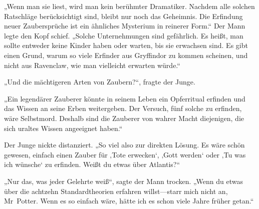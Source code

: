 „Wenn man sie liest, wird man kein berühmter Dramatiker. Nachdem alle solchen Ratschläge berücksichtigt sind, bleibt nur noch das Geheimnis. Die Erfindung neuer Zaubersprüche ist ein ähnliches Mysterium in reinerer Form.“
Der Mann legte den Kopf schief.
„Solche Unternehmungen sind gefährlich. Es heißt, man sollte entweder keine Kinder haben oder warten, bis sie erwachsen sind. Es gibt einen Grund, warum so viele Erfinder aus Gryffindor zu kommen scheinen, und nicht aus Ravenclaw, wie man vielleicht erwarten würde.“

„Und die mächtigeren Arten von Zaubern?“, fragte der Junge.

„Ein legendärer Zauberer könnte in seinem Leben ein Opferritual erfinden und das Wissen an seine Erben weitergeben. Der Versuch, fünf solche zu erfinden, wäre Selbstmord. Deshalb sind die Zauberer von wahrer Macht diejenigen, die sich uraltes Wissen angeeignet haben.“

Der Junge nickte distanziert.
„So viel also zur direkten Lösung. Es wäre schön gewesen, einfach einen Zauber für ‚Tote erwecken‘, ‚Gott werden‘ oder ‚Tu was ich wünsche‘ zu erfinden. Weißt du etwas über Atlantis?“

„Nur das, was jeder Gelehrte weiß“, sagte der Mann trocken. „Wenn du etwas über die achtzehn Standardtheorien erfahren willst—starr mich nicht an, Mr~Potter. Wenn es so einfach wäre, hätte ich es schon viele Jahre früher getan.“

